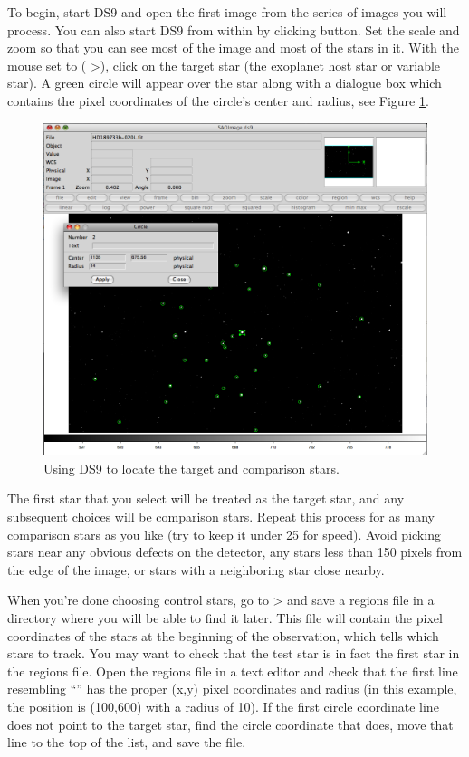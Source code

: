 \documentclass[a4paper]{article}
\begin{document}
To begin, start DS9 and open the first image from the series of images you will process. You can also start DS9 from within \oscaar by clicking  button. Set the scale and zoom so that you can see most of the image and most of the stars in it. With the mouse set to  ( \textgreater  {}), click on the target star (the exoplanet host star or variable star). A green circle will appear over the star along with a dialogue box which contains the pixel coordinates of the circle's center and radius, see Figure \ref{fig:ds9}. 
\begin{figure}[h]
\begin{center}
\includegraphics[scale=0.2]{imgs/ds9.png}
\caption{Using DS9 to locate the target and comparison stars.}
\label{fig:ds9}
\end{center}	
\end{figure}
The first star that you select will be treated as the target star, and any subsequent choices will be comparison stars. Repeat this process for as many comparison stars as you like (try to keep it under 25 for speed). Avoid picking stars near any obvious defects on the detector, any stars less than 150 pixels from the edge of the image, or stars with a neighboring star close nearby. 

When you're done choosing control stars, go to  \textgreater  {} and save a regions file in a directory where you will be able to find it later. This file will contain the pixel coordinates of the stars at the beginning of the observation, which tells \oscaar which stars to track. You may want to check that the test star is in fact the first star in the regions file. Open the regions file in a text editor and check that the first line resembling ``'' has the proper (x,y) pixel coordinates and radius (in this example, the position is (100,600) with a radius of 10). If the first circle coordinate line does not point to the target star, find the circle coordinate that does, move that line to the top of the list, and save the file.
\end{document}
